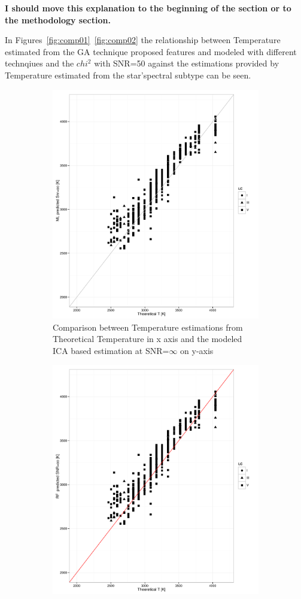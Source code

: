 {\bf I should move this explanation to the beginning of the
section or to the methodology section.}


In Figures~\ref{fig:comp01}~\ref{fig:comp02} the relationship between Temperature
estimated from the GA technique proposed features and modeled with different 
technqiues and the $chi^2$ with SNR=50 against the 
estimations provided by Temperature estimated from 
the star\textquoteright spectral subtype can be seen.

\begin {figure}
 \centering
 \begin{subfigure}{.85\textwidth}
  \centering
  \includegraphics[width=11cm]{figs/ipac_T_ICAoo_LSB.pdf}
  \caption{Comparison between Temperature estimations from Theoretical Temperature 
  in x axis and the modeled ICA based estimation at SNR=$\infty$ on y-axis}
 \label{fig:ipac_icaoo_lsb}
 \end{subfigure}
  \begin{subfigure}{.85\textwidth}
  \centering
  \includegraphics[width=11cm]{figs/ipac_T_RFoo_LSB.pdf}

\end{subfigure}
\end{figure}
